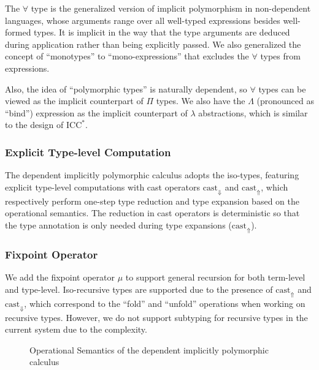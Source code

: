 \documentclass{llncs}
\newcommand{\castup}[0]{\mathrm{cast}_\Uparrow}
\newcommand{\castdn}[0]{\mathrm{cast}_\Downarrow}
\newcommand{\system}[0]{the dependent implicitly polymorphic calculus\xspace}
\newcommand{\System}[0]{The dependent implicitly polymorphic calculus\xspace}
\begin{document}
The $\forall$ type is the generalized version of implicit polymorphism in
non-dependent languages, whose arguments range over all well-typed expressions
besides well-formed types. It is implicit in the way that the type arguments are
deduced during application rather than being explicitly passed.
We also generalized the concept of ``monotypes'' to
``mono-expressions'' that excludes the $\forall$ types from expressions.

Also, the idea of ``polymorphic types'' is naturally dependent, so $\forall$
types can be viewed as the implicit counterpart of $\Pi$ types. We also have
the $\Lambda$ (pronounced as ``bind'') expression as the implicit counterpart of
$\lambda$ abstractions, which is similar to the design of $\text{ICC}^*$\cite{barras2008implicit}.

\subsubsection{Explicit Type-level Computation}
\label{sec:cast}

\System adopts the iso-types\cite{yang2016unified}, featuring explicit type-level
computations with cast operators $\castdn$ and $\castup$, which respectively perform one-step
type reduction and type expansion based on the operational semantics.
The reduction in cast operators is deterministic so that the type annotation is
only needed during type expansions ($\castup$).

\subsubsection{Fixpoint Operator}

We add the fixpoint operator $\mu$ to support general recursion for both term-level
and type-level. Iso-recursive types are supported due to the presence of $\castup$
and $\castdn$, which correspond to the ``fold'' and ``unfold'' operations when
working on recursive types. However, we do not support subtyping for recursive
types in the current system due to the complexity.

\begin{figure}
    \centering


    \caption{Operational Semantics of \system}
    \label{fig:semantics}
\end{figure}
\end{document}
